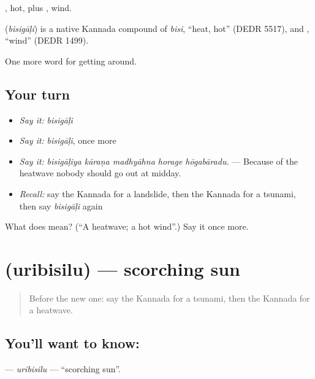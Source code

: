 , hot, plus , wind.

\begin{cousinweb}
\textbf{} (\emph{bisigāḷi}) is a native Kannada compound of \emph{bisi}, \textquotedblleft{}heat, hot\textquotedblright{} (DEDR 5517), and , \textquotedblleft{}wind\textquotedblright{} (DEDR 1499).
\end{cousinweb}

\begin{grammarlens}[title={What you've built}]
One more word for getting around.
\end{grammarlens}

\subsection*{Your turn}
\begin{itemize}
\raggedright
  \item \emph{Say it:} \emph{bisigāḷi}
  \item \emph{Say it:} \emph{bisigāḷi}, once more
  \item \emph{Say it:} \emph{bisigāḷiya kāraṇa madhyāhna horage hōgabāradu.} — Because of the heatwave nobody should go out at midday.
  \item \emph{Recall:} say the Kannada for a landslide, then the Kannada for a tsunami, then say \emph{bisigāḷi} again
\end{itemize}

\begin{tcolorbox}[breakable,colback=teal!4,colframe=teal!35!black,title={Before you move on}]
What does  mean? (\textquotedblleft{}A heatwave; a hot wind\textquotedblright{}.) Say it once more.
\end{tcolorbox}
\section[\texorpdfstring{\kn{ಉರಿಬಿಸಿಲು} (uribisilu)}{ಉರಿಬಿಸಿಲು (uribisilu)}]{ (uribisilu) — scorching sun}

\label{lesson:KA-C488-uribisilu}



\begin{quote}
Before the new one: say the Kannada for a tsunami, then the Kannada for a heatwave.
\end{quote}

\subsection*{You'll want to know: }
\textbf{} — \emph{uribisilu} — \textquotedblleft{}scorching sun\textquotedblright{}.

